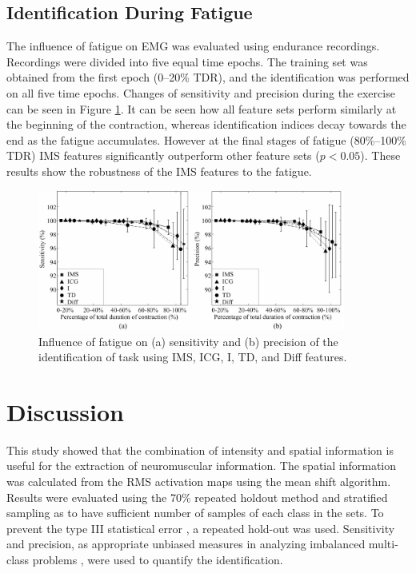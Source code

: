 \subsection{Identification During Fatigue}
The influence of fatigue on EMG was evaluated using endurance recordings. Recordings were divided into five equal time epochs. The training set was obtained from the first epoch (0–20\% TDR), and the identification was performed on all five time epochs.
Changes of sensitivity and precision during the exercise can be seen in Figure \ref{fig:3-11}. It can be seen how all feature sets perform similarly at the beginning of the contraction, whereas identification indices decay towards the end as the fatigue accumulates. However at the final stages of fatigue (80\%–100\% TDR) IMS features significantly outperform other feature sets ($p < 0.05$). These results show the robustness of the IMS features to the fatigue.

\begin{figure}[ht]
\centering
\includegraphics[width=0.9\textwidth]{Images/figure3_11.png}
\caption{Influence of fatigue on (a) sensitivity and (b) precision of the identification of task using IMS, ICG, I, TD, and Diff features.}
\label{fig:3-11}
\end{figure}   
\clearpage

\section{Discussion}
This study showed that the combination of intensity and spatial information is useful for the extraction of neuromuscular information. The spatial information was calculated from the RMS activation maps using the mean shift algorithm. Results were evaluated using the 70\% repeated holdout method and stratified sampling as to have sufficient number of samples of each class in the sets. To prevent the type III statistical error \citep{Mosteller1948, Mohebian2017}, a repeated hold-out was used. Sensitivity and precision, as appropriate unbiased measures in analyzing imbalanced multi-class problems \citep{Jordanic2016b, Rojas-Martinez2013}, were used to quantify the identification.

